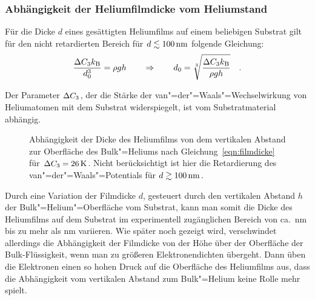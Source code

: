 \subsubsection{Abhängigkeit der Heliumfilmdicke vom Heliumstand}

Für die Dicke $d$ eines gesättigten Heliumfilms auf einem beliebigen Substrat gilt für den nicht retardierten Bereich für $d\lesssim\unit[100]{nm}$ folgende Gleichung:
    \begin{equation}
        \label{eqn:filmdicke}
        \frac{\Delta C_3 k_\text{B}}{d_0^3}=\rho g h
            \qquad\Rightarrow\qquad
            d_0=\sqrt[3]{\frac{\Delta C_3k_\text{B}}{\rho g h}}\quad.
    \end{equation}

Der Parameter $\Delta C_3$, der die Stärke der van"=der"=Waals"=Wechselwirkung von Heliumatomen mit dem Substrat widerspiegelt, ist vom Substratmaterial abhängig.  
\begin{figure}[h!tbp]
    \begin{center}
         \quad
    \end{center}
    \caption[Filmdicke des Heliumfilms über der Bulk"=Flüssigkeit]{Abhängigkeit der Dicke des Heliumfilms von dem vertikalen Abstand zur Oberfläche des Bulk"=Heliums nach Gleichung~\eqref{eqn:filmdicke} für $\DC=\unit[26]{K}$. Nicht berücksichtigt ist hier die Retardierung des van"=der"=Waals"=Potentials für $d\gtrsim\unit[100]{nm}$.}
\end{figure}

Durch eine Variation der Filmdicke $d$, gesteuert durch den vertikalen Abstand $h$ der Bulk"=Helium"=Oberfläche vom Substrat, kann man somit die Dicke des Heliumfilms auf dem Substrat im experimentell zugänglichen Bereich von ca.\ \unit[25]{nm} bis zu mehr als \unit[90]{nm} variieren. Wie später noch gezeigt wird, verschwindet allerdings die Abhängigkeit der Filmdicke von der Höhe über der Oberfläche der Bulk-Flüssigkeit, wenn man zu größeren Elektronendichten übergeht. Dann üben die Elektronen einen so hohen Druck auf die Oberfläche des Heliumfilms aus, dass die Abhängigkeit vom vertikalen Abstand zum Bulk"=Helium keine Rolle mehr spielt.

